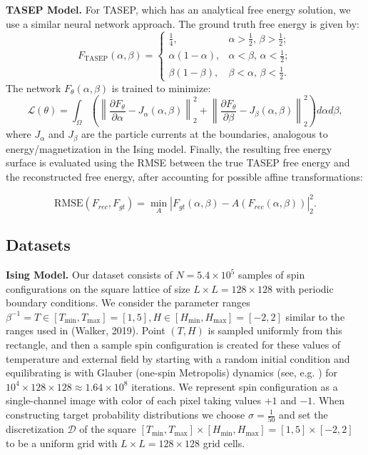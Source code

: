 \documentclass{article}
\theoremstyle{plain}
\theoremstyle{definition}
\theoremstyle{remark}
\begin{document}
\textbf{TASEP Model.} For TASEP, which has an analytical free energy solution, we use a similar neural network approach. The ground truth free energy is given by:
\begin{equation}
F_{\text{TASEP}}(\alpha, \beta) = 
\begin{cases}
\frac{1}{4}, & \alpha > \frac{1}{2}, \, \beta > \frac{1}{2}; \\
\alpha(1-\alpha), & \alpha < \beta, \, \alpha < \frac{1}{2}; \\
\beta(1-\beta), & \beta < \alpha, \, \beta < \frac{1}{2}.
\end{cases}
\end{equation}
The network $F_{\theta}(\alpha, \beta)$ is trained to minimize:
\begin{equation}
    \mathcal{L}(\theta) = \int_{\Omega} \left( \left\| \frac{\partial F_{\theta}}{\partial \alpha} - J_{\alpha}(\alpha, \beta) \right\|_{2}^{2} + \left\| \frac{\partial F_{\theta}}{\partial \beta} - J_{\beta}(\alpha, \beta) \right\|_{2}^{2} \right) d\alpha d\beta,
\end{equation}
where $J_{\alpha}$ and $J_{\beta}$ are the particle currents at the boundaries, analogous to energy/magnetization in the Ising model. Finally, the resulting free energy surface is evaluated using the RMSE between the true TASEP free energy and the reconstructed free energy, after accounting for possible affine transformations:

\begin{equation} \text{RMSE}(F_{rec}, F_{gt}) = \min_{A} \left| F_{gt}(\alpha,\beta) - A(F_{rec}(\alpha,\beta)) \right|_{2}^{2}. \end{equation}

\subsection{Datasets}
\label{subsec:datasets}

\textbf{Ising Model.} Our dataset consists of $N=5.4\times 10^5$ samples of spin configurations on the square lattice of size $L\times L =128 \times 128$ with periodic boundary conditions. We consider the parameter ranges $\beta^{-1} = T \in [T_{\min}, T_{\max}]=[1, 5], H \in [H_{\min}, H_{\max}]=[-2, 2]$ similar to the ranges used in (Walker, 2019). Point $(T, H)$ is sampled uniformly from this rectangle, and then a sample spin configuration is created for these values of temperature and external field by starting with a random initial condition and equilibrating is with Glauber (one-spin Metropolis) dynamics (see, e.g. \cite{krapivsky_book}) for $10^{4}\times 128 \times 128 \approx 1.64 \times 10^{8}$ iterations. We represent spin configuration as a single-channel image with color of each pixel taking values $+1$ and $-1$. When constructing target probability distributions we choose $\sigma=\frac{1}{50}$ and set the discretization $\mathcal{D}$ of the square $[T_{\min}, T_{\max}]\times[H_{\min}, H_{\max}] = [1, 5]\times[-2, 2]$ to be a uniform grid with $L\times L =128 \times 128$ grid cells.
\end{document}
